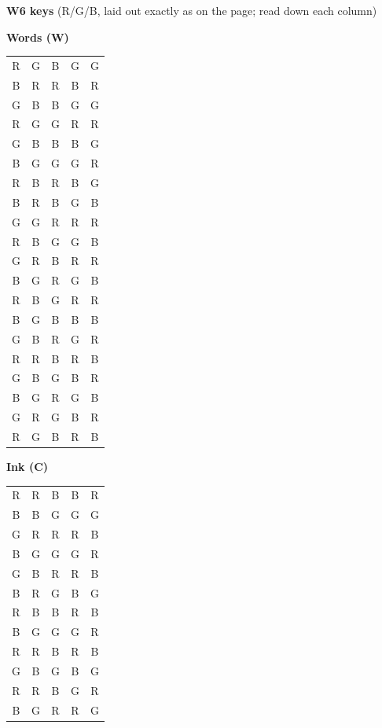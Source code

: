 \documentclass[10pt,a4paper]{article}
\begin{document}
\textbf{W6 keys} (R/G/B, laid out exactly as on the page; read down each column)\par\medskip\begin{minipage}[t]{0.3\linewidth}\centering\textbf{Words (W)}\\[2pt]\ttfamily\footnotesize\begin{tabular}{ccccc}R & G & B & G & G\\
B & R & R & B & R\\
G & B & B & G & G\\
R & G & G & R & R\\
G & B & B & B & G\\
B & G & G & G & R\\
R & B & R & B & G\\
B & R & B & G & B\\
G & G & R & R & R\\
R & B & G & G & B\\
G & R & B & R & R\\
B & G & R & G & B\\
R & B & G & R & R\\
B & G & B & B & B\\
G & B & R & G & R\\
R & R & B & R & B\\
G & B & G & B & R\\
B & G & R & G & B\\
G & R & G & B & R\\
R & G & B & R & B\\\end{tabular}\end{minipage}\hfill\begin{minipage}[t]{0.3\linewidth}\centering\textbf{Ink (C)}\\[2pt]\ttfamily\footnotesize\begin{tabular}{ccccc}R & R & B & B & R\\
B & B & G & G & G\\
G & R & R & R & B\\
B & G & G & G & R\\
G & B & R & R & B\\
B & R & G & B & G\\
R & B & B & R & B\\
B & G & G & G & R\\
R & R & B & R & B\\
G & B & G & B & G\\
R & R & B & G & R\\
B & G & R & R & G\\

\end{tabular}
\end{minipage}
\end{document}
